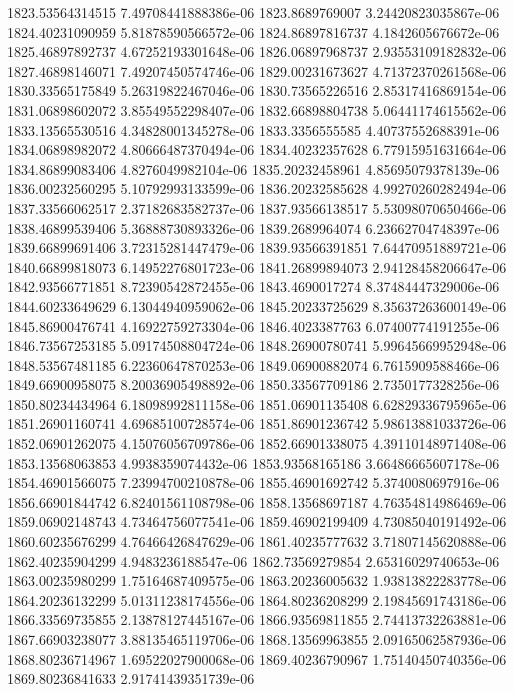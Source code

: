 {1823.53564314515 7.49708441888386e-06
1823.8689769007 3.24420823035867e-06
1824.40231090959 5.81878590566572e-06
1824.86897816737 4.1842605676672e-06
1825.46897892737 4.67252193301648e-06
1826.06897968737 2.93553109182832e-06
1827.46898146071 7.49207450574746e-06
1829.00231673627 4.71372370261568e-06
1830.33565175849 5.26319822467046e-06
1830.73565226516 2.85317416869154e-06
1831.06898602072 3.85549552298407e-06
1832.66898804738 5.06441174615562e-06
1833.13565530516 4.34828001345278e-06
1833.3356555585 4.40737552688391e-06
1834.06898982072 4.80666487370494e-06
1834.40232357628 6.77915951631664e-06
1834.86899083406 4.8276049982104e-06
1835.20232458961 4.85695079378139e-06
1836.00232560295 5.10792993133599e-06
1836.20232585628 4.99270260282494e-06
1837.33566062517 2.37182683582737e-06
1837.93566138517 5.53098070650466e-06
1838.46899539406 5.36888730893326e-06
1839.2689964074 6.23662704748397e-06
1839.66899691406 3.72315281447479e-06
1839.93566391851 7.64470951889721e-06
1840.66899818073 6.14952276801723e-06
1841.26899894073 2.94128458206647e-06
1842.93566771851 8.72390542872455e-06
1843.4690017274 8.37484447329006e-06
1844.60233649629 6.13044940959062e-06
1845.20233725629 8.35637263600149e-06
1845.86900476741 4.16922759273304e-06
1846.4023387763 6.07400774191255e-06
1846.73567253185 5.09174508804724e-06
1848.26900780741 5.99645669952948e-06
1848.53567481185 6.22360647870253e-06
1849.06900882074 6.7615909588466e-06
1849.66900958075 8.20036905498892e-06
1850.33567709186 2.7350177328256e-06
1850.80234434964 6.18098992811158e-06
1851.06901135408 6.62829336795965e-06
1851.26901160741 4.69685100728574e-06
1851.86901236742 5.98613881033726e-06
1852.06901262075 4.15076056709786e-06
1852.66901338075 4.39110148971408e-06
1853.13568063853 4.9938359074432e-06
1853.93568165186 3.66486665607178e-06
1854.46901566075 7.23994700210878e-06
1855.46901692742 5.3740080697916e-06
1856.66901844742 6.82401561108798e-06
1858.13568697187 4.76354814986469e-06
1859.06902148743 4.73464756077541e-06
1859.46902199409 4.73085040191492e-06
1860.60235676299 4.76466426847629e-06
1861.40235777632 3.71807145620888e-06
1862.40235904299 4.9483236188547e-06
1862.73569279854 2.65316029740653e-06
1863.00235980299 1.75164687409575e-06
1863.20236005632 1.93813822283778e-06
1864.20236132299 5.01311238174556e-06
1864.80236208299 2.19845691743186e-06
1866.33569735855 2.13878127445167e-06
1866.93569811855 2.74413732263881e-06
1867.66903238077 3.88135465119706e-06
1868.13569963855 2.09165062587936e-06
1868.80236714967 1.69522027900068e-06
1869.40236790967 1.75140450740356e-06
1869.80236841633 2.91741439351739e-06
}
